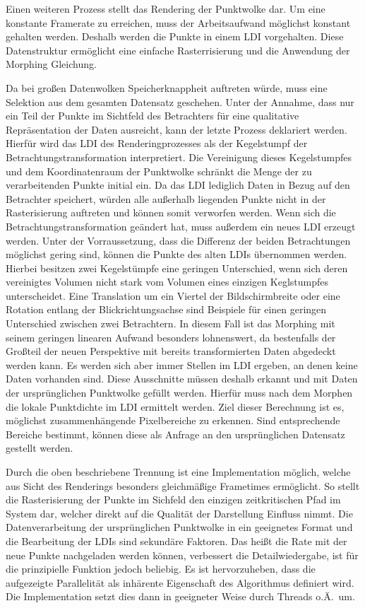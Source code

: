 \documentclass[hyperref, beleg, german, final, twoside]{cgvpub}
\begin{document}
Einen weiteren Prozess stellt das Rendering der Punktwolke dar. Um eine
konstante Framerate zu erreichen, muss der Arbeitsaufwand möglichst konstant
gehalten werden. Deshalb werden die Punkte in einem LDI vorgehalten. Diese
Datenstruktur ermöglicht eine einfache Rasterrisierung und die Anwendung der
Morphing Gleichung.

Da bei großen Datenwolken Speicherknappheit auftreten würde, muss eine
Selektion aus dem gesamten Datensatz geschehen. Unter der Annahme, dass nur ein
Teil der Punkte im Sichtfeld des Betrachters für eine qualitative
Repräsentation der Daten ausreicht, kann der letzte Prozess deklariert werden.
Hierfür wird das LDI des Renderingprozesses als der Kegelstumpf der
Betrachtungstransformation interpretiert. Die Vereinigung dieses Kegelstumpfes
und dem Koordinatenraum der Punktwolke schränkt die Menge der zu verarbeitenden
Punkte initial ein. Da das LDI lediglich Daten in Bezug auf den Betrachter
speichert, würden alle außerhalb liegenden Punkte nicht in der Rasterisierung
auftreten und können somit verworfen werden. Wenn sich die
Betrachtungstransformation geändert hat, muss außerdem ein neues LDI erzeugt
werden. Unter der Vorraussetzung, dass die Differenz der beiden Betrachtungen
möglichst gering sind, können die Punkte des alten LDIs übernommen werden.
Hierbei besitzen zwei Kegelstümpfe eine geringen Unterschied, wenn sich deren
vereinigtes Volumen nicht stark vom Volumen eines einzigen Keglstumpfes
unterscheidet. Eine Translation um ein Viertel der Bildschirmbreite oder eine
Rotation entlang der Blickrichtungsachse sind Beispiele für einen geringen
Unterschied zwischen zwei Betrachtern. In diesem Fall ist das Morphing mit
seinem geringen linearen Aufwand besonders lohnenswert, da bestenfalls der
Großteil der neuen Perspektive mit bereits transformierten Daten abgedeckt
werden kann. Es werden sich aber immer Stellen im LDI ergeben, an denen keine
Daten vorhanden sind. Diese Ausschnitte müssen deshalb erkannt und mit Daten
der ursprünglichen Punktwolke gefüllt werden. Hierfür muss nach dem Morphen die
lokale Punktdichte im LDI ermittelt werden. Ziel dieser Berechnung ist es,
möglichst zusammenhängende Pixelbereiche zu erkennen. Sind entsprechende
Bereiche bestimmt, können diese als Anfrage an den ursprünglichen Datensatz
gestellt werden.

Durch die oben beschriebene Trennung ist eine Implementation möglich, welche
aus Sicht des Renderings besonders gleichmäßige Frametimes ermöglicht. So
stellt die Rasterisierung der Punkte im Sichfeld den einzigen zeitkritischen
Pfad im System dar, welcher direkt auf die Qualität der Darstellung Einfluss
nimmt. Die Datenverarbeitung der ursprünglichen Punktwolke in ein geeignetes
Format und die Bearbeitung der LDIs sind sekundäre Faktoren. Das heißt die Rate
mit der neue Punkte nachgeladen werden können, verbessert die Detailwiedergabe,
ist für die prinzipielle Funktion jedoch beliebig. Es ist hervorzuheben,
dass die aufgezeigte Parallelität als inhärente Eigenschaft des Algorithmus
definiert wird. Die Implementation setzt dies dann in geeigneter Weise durch
Threads o.Ä.\ um.
\end{document}
